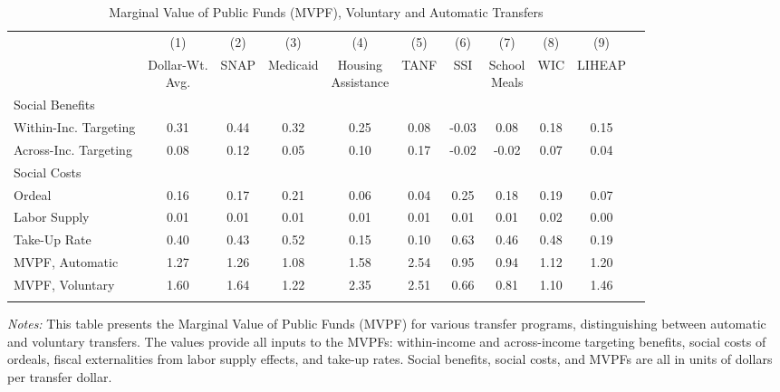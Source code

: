 \begin{table}[H]
    \centering
    \caption{Marginal Value of Public Funds (MVPF), Voluntary and Automatic Transfers}   \label{fig:mvpf}
  
     \begin{tabular*}{1.36\textwidth}{@{\extracolsep{\fill}}lcccccccccc@{}}
  \toprule \addlinespace
  & (1) & (2) & (3) & (4) & (5) & (6) & (7) & (8) & (9) \\   \addlinespace \cmidrule{2-10} \addlinespace
                      & \shortstack{Dollar-Wt. \\ Avg.} & SNAP  & Medicaid & \shortstack{ Housing \\ Assistance} & TANF  & SSI   & \shortstack{School \\ Meals} & WIC   & LIHEAP \\ \addlinespace \midrule \addlinespace
  Social Benefits &                      &       &          &                    &       &       &              &       &        \\ \addlinespace
  \quad Within-Inc. Targeting     & 0.31                 & 0.44 & 0.32      & 0.25               & 0.08 & -0.03 & 0.08        & 0.18 & 0.15   \\
  \quad Across-Inc. Targeting     & 0.08                  & 0.12 & 0.05     & 0.10               & 0.17 & -0.02 & -0.02         & 0.07 & 0.04  \\ \addlinespace
  Social Costs \\ \addlinespace
  \quad Ordeal         & 0.16                & 0.17 & 0.21     & 0.06               & 0.04 & 0.25 & 0.18         & 0.19 & 0.07   \\
  \quad Labor Supply        & 0.01                 & 0.01 & 0.01     & 0.01               & 0.01 & 0.01 & 0.01         & 0.02 & 0.00 \\ \addlinespace \midrule \addlinespace
  Take-Up Rate & 0.40                 & 0.43  & 0.52     & 0.15               & 0.10 & 0.63 & 0.46         & 0.48 & 0.19 \\ \addlinespace \midrule
  \addlinespace MVPF, Automatic     &  1.27                  & 1.26 & 1.08     & 1.58              & 2.54 & 0.95 & 0.94        & 1.12 & 1.20   \\
  MVPF, Voluntary     & 1.60                   & 1.64   & 1.22        & 2.35                & 2.51   & 0.66   & 0.81           & 1.10  & 1.46    \\ \addlinespace  \bottomrule
  \end{tabular*}
  \begin{spacing}{1}
      \begin{tablenotes}
            \item \footnotesize \textit{Notes:} This table presents the Marginal Value of Public Funds (MVPF) for various transfer programs, distinguishing between automatic and voluntary transfers. The values provide all inputs to the MVPFs: within-income and across-income targeting benefits, social costs of ordeals, fiscal externalities from labor supply effects, and take-up rates. Social benefits, social costs, and MVPFs are all in units of dollars per transfer dollar.
            \end{tablenotes}
             \end{spacing}
            \end{table}
